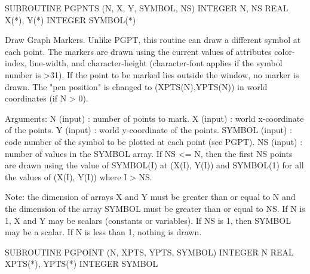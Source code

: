 {\eightpoint\begintt
      SUBROUTINE PGPNTS (N, X, Y, SYMBOL, NS)
      INTEGER N, NS
      REAL X(*), Y(*)
      INTEGER SYMBOL(*)
 
Draw Graph Markers. Unlike PGPT, this routine can draw a different
symbol at each point. The markers
are drawn using the current values of attributes color-index,
line-width, and character-height (character-font applies if the symbol
number is >31).  If the point to be marked lies outside the window,
no marker is drawn.  The "pen position" is changed to
(XPTS(N),YPTS(N)) in world coordinates (if N > 0).
 
Arguments:
 N      (input)  : number of points to mark.
 X      (input)  : world x-coordinate of the points.
 Y      (input)  : world y-coordinate of the points.
 SYMBOL (input)  : code number of the symbol to be plotted at each
                   point (see PGPT).
 NS     (input)  : number of values in the SYMBOL array.  If NS <= N,
                   then the first NS points are drawn using the value
                   of SYMBOL(I) at (X(I), Y(I)) and SYMBOL(1) for all
                   the values of (X(I), Y(I)) where I > NS.
 
Note: the dimension of arrays X and Y must be greater than or equal
to N and the dimension of the array SYMBOL must be greater than or
equal to NS.  If N is 1, X and Y may be scalars (constants or
variables).  If NS is 1, then SYMBOL may be a scalar.  If N is
less than 1, nothing is drawn.
\endtt}

{\eightpoint\begintt
      SUBROUTINE PGPOINT (N, XPTS, YPTS, SYMBOL)
      INTEGER N
      REAL XPTS(*), YPTS(*)
      INTEGER SYMBOL
\endtt}


